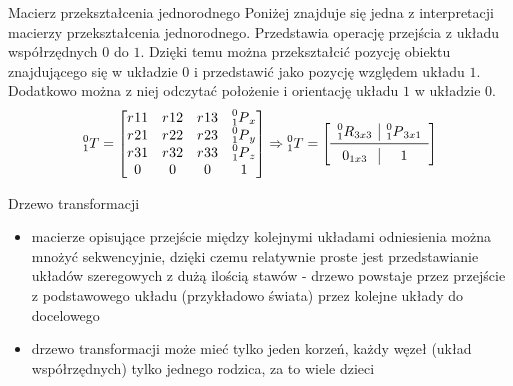 
\begin{frame}
{Macierz przekształcenia jednorodnego}
Poniżej znajduje się jedna z interpretacji macierzy przekształcenia jednorodnego.
Przedstawia operację przejścia z układu współrzędnych $0$ do $1$. 
Dzięki temu można przekształcić pozycję obiektu znajdującego się w układzie $0$ i przedstawić jako pozycję względem układu $1$.
Dodatkowo można z niej odczytać położenie i orientację układu $1$ w układzie $0$.
\begin{equation*}
	\prescript{0}{1}T = 
	\begin{bmatrix}
		r_{}11 	& r_{}12	&	r_{}13	& \prescript{0}{1}P_x \\
		r_{}21 	& r_{}22	&	r_{}23	& \prescript{0}{1}P_y \\
		r_{}31 	& r_{}32	& r_{}33	& \prescript{0}{1}P_z \\
		0				&	0				&	0				&	1										\\
	\end{bmatrix}
	\Rightarrow
		\prescript{0}{1}T = 
	 \left[ \begin{array}{c|c}
   \prescript{0}{1}R_{3x3} 	& \prescript{0}{1}P_{3x1} \\
   \midrule
   0_{1x3}									& 1												\\
\end{array}\right]
\end{equation*}
\end{frame}



\begin{frame}
{Drzewo transformacji}
	\begin{itemize}
		\item macierze opisujące przejście między kolejnymi układami odniesienia można mnożyć sekwencyjnie, dzięki czemu relatywnie proste jest przedstawianie układów szeregowych z dużą ilością stawów - drzewo powstaje przez przejście z podstawowego układu (przykładowo świata) przez kolejne układy do docelowego
		\item drzewo transformacji może mieć tylko jeden korzeń, każdy węzeł (układ współrzędnych) tylko jednego rodzica, za to wiele dzieci
	\end{itemize}
	
	
\end{frame}

